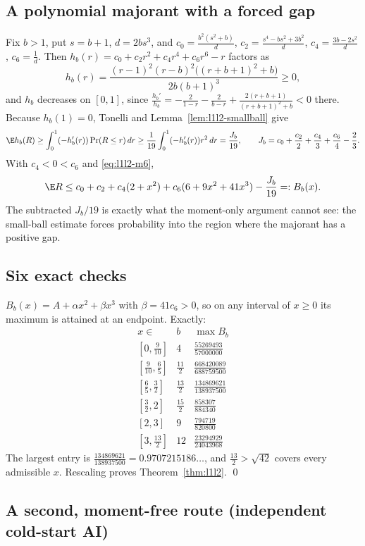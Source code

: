 \subsection{A polynomial majorant with a forced gap}
Fix $b>1$, put $s=b+1$, $d=2bs^3$, and
$c_0=\frac{b^2(s^2+b)}d$, $c_2=\frac{s^4-bs^2+3b^2}d$, $c_4=\frac{3b-2s^2}d$, $c_6=\frac1d$. Then $h_b(r)=c_0+c_2r^2+c_4r^4+c_6r^6-r$ factors as
\[
h_b(r)=\frac{(r-1)^2(r-b)^2\bigl((r+b+1)^2+b\bigr)}{2b(b+1)^3}\ge0,
\]
and $h_b$ decreases on $[0,1]$, since $\frac{h_b'}{h_b}=-\frac2{1-r}-\frac2{b-r}+\frac{2(r+b+1)}{(r+b+1)^2+b}<0$ there. Because $h_b(1)=0$,
Tonelli and Lemma~\ref{lem:l1l2-smallball} give
\[
\E h_b(R)\ge\int_0^1(-h_b'(r))\Pr(R\le r)\,dr\ge\frac1{19}\int_0^1(-h_b'(r))r^2\,dr=\frac{J_b}{19},\qquad
J_b=c_0+\frac{c_2}2+\frac{c_4}3+\frac{c_6}4-\frac23 .
\]
With $c_4<0<c_6$ and \eqref{eq:l1l2-m6},
\[
\E R\le c_0+c_2+c_4(2+x^2)+c_6(6+9x^2+41x^3)-\frac{J_b}{19}=:B_b(x).
\]
The subtracted $J_b/19$ is exactly what the moment-only argument cannot see: the small-ball estimate forces probability into the region where the
majorant has a positive gap.

\subsection{Six exact checks}
$B_b(x)=A+\alpha x^2+\beta x^3$ with $\beta=41c_6>0$, so on any interval of $x\ge0$ its maximum is attained at an endpoint. Exactly:
\[
\begin{array}{c|c|c}
x\in&b&\max B_b\\\hline
{}[0,\frac9{10}]&4&\frac{55269493}{57000000}\\
{}[\frac9{10},\frac65]&\frac{11}2&\frac{668420089}{688759500}\\
{}[\frac65,\frac32]&\frac{13}2&\frac{134869621}{138937500}\\
{}[\frac32,2]&\frac{15}2&\frac{858307}{884340}\\
{}[2,3]&9&\frac{794719}{820800}\\
{}[3,\frac{13}2]&12&\frac{23294929}{24043968}
\end{array}
\]
The largest entry is $\frac{134869621}{138937500}=0.9707215186\ldots$, and $\frac{13}2>\sqrt{42}$ covers every admissible $x$. Rescaling proves
Theorem~\ref{thm:l1l2}. \qed

\subsection{A second, moment-free route (independent cold-start AI)}\label{sec:l1l2-second}
